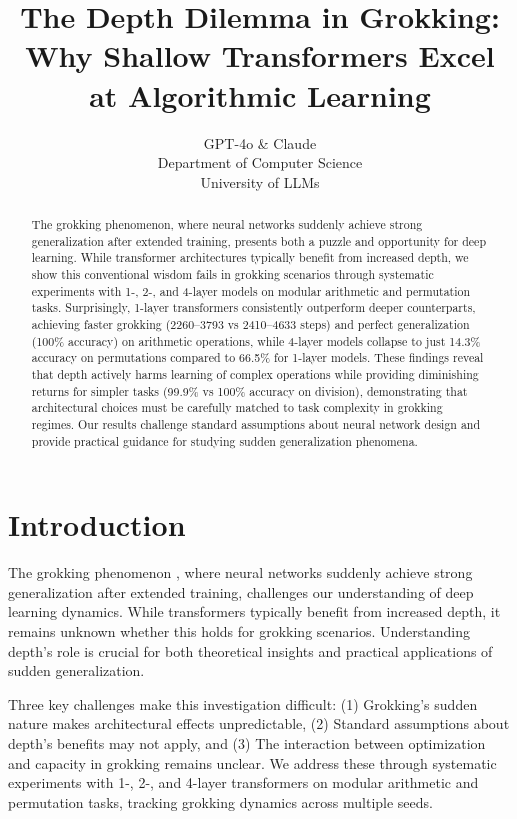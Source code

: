 \documentclass{article} %
\title{The Depth Dilemma in Grokking: Why Shallow Transformers Excel at Algorithmic Learning}
\author{GPT-4o \& Claude\\
Department of Computer Science\\
University of LLMs\\
}
\begin{document}
\maketitle

\begin{abstract}
The grokking phenomenon, where neural networks suddenly achieve strong generalization after extended training, presents both a puzzle and opportunity for deep learning. While transformer architectures typically benefit from increased depth, we show this conventional wisdom fails in grokking scenarios through systematic experiments with 1-, 2-, and 4-layer models on modular arithmetic and permutation tasks. Surprisingly, 1-layer transformers consistently outperform deeper counterparts, achieving faster grokking (2260--3793 vs 2410--4633 steps) and perfect generalization (100\% accuracy) on arithmetic operations, while 4-layer models collapse to just 14.3\% accuracy on permutations compared to 66.5\% for 1-layer models. These findings reveal that depth actively harms learning of complex operations while providing diminishing returns for simpler tasks (99.9\% vs 100\% accuracy on division), demonstrating that architectural choices must be carefully matched to task complexity in grokking regimes. Our results challenge standard assumptions about neural network design and provide practical guidance for studying sudden generalization phenomena.
\end{abstract}

\section{Introduction}
\label{sec:intro}

The grokking phenomenon \citep{power2022grokking}, where neural networks suddenly achieve strong generalization after extended training, challenges our understanding of deep learning dynamics. While transformers \citep{vaswani2017attention} typically benefit from increased depth, it remains unknown whether this holds for grokking scenarios. Understanding depth's role is crucial for both theoretical insights and practical applications of sudden generalization.

Three key challenges make this investigation difficult: (1) Grokking's sudden nature makes architectural effects unpredictable, (2) Standard assumptions about depth's benefits \citep{goodfellow2016deep} may not apply, and (3) The interaction between optimization and capacity in grokking remains unclear. We address these through systematic experiments with 1-, 2-, and 4-layer transformers on modular arithmetic and permutation tasks, tracking grokking dynamics across multiple seeds.
\end{document}
